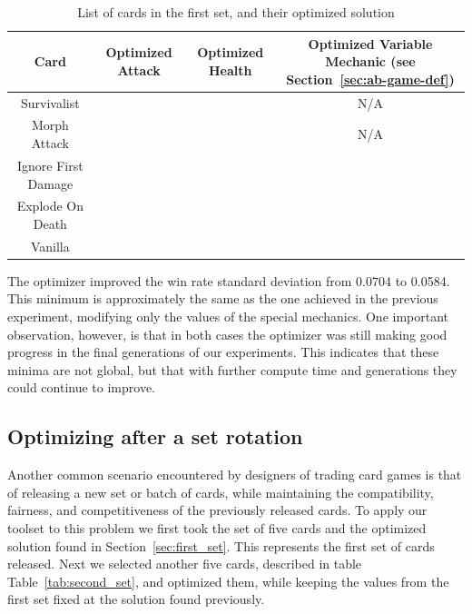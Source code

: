 \begin{table}[t]
\centering
\begin{tabular}{||c c c c||} 
 \hline
 Card & Optimized Attack & Optimized Health & Optimized Variable Mechanic (see Section~\ref{sec:ab-game-def})\\ [0.5ex]
 \hline
 Survivalist &  &  & N/A \\
 \hline
 Morph Attack &  &  & N/A \\
 \hline
 Ignore First Damage &  &  & \\
 \hline
 Explode On Death &  &  &  \\ 
 \hline
 Vanilla &  &  &  \\
 \hline
\end{tabular}
\caption{List of cards in the first set, and their optimized solution}
\label{tab:first_set}
\end{table}

The optimizer improved the win rate standard deviation from 0.0704 to 0.0584. This minimum is approximately the same as the one achieved in the previous experiment, modifying only the values of the special mechanics. One important observation, however, is that in both cases the optimizer was still making good progress in the final generations of our experiments. This indicates that these minima are not global, but that with further compute time and generations they could continue to improve.

\subsection{Optimizing after a set rotation}

Another common scenario encountered by designers of trading card games is that of releasing a new set or batch of cards, while maintaining the compatibility, fairness, and competitiveness of the previously released cards. To apply our toolset to this problem we first took the set of five cards and the optimized solution found in Section~\ref{sec:first_set}. This represents the first set of cards released. Next we selected another five cards, described in table Table~\ref{tab:second_set}, and optimized them, while keeping the values from the first set fixed at the solution found previously. 


